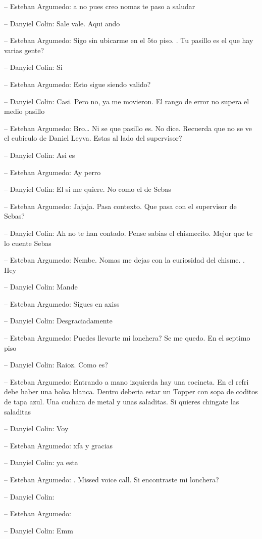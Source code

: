 -- Esteban Argumedo: a no pues creo nomas te paso a saludar

-- Danyiel Colin: Sale vale. Aqui ando

-- Esteban Argumedo: Sigo sin ubicarme en el 5to piso. . Tu pasillo es
el que hay varias gente?

-- Danyiel Colin: Si

-- Esteban Argumedo: Esto sigue siendo valido?

-- Danyiel Colin: Casi. Pero no, ya me movieron. El rango de error no
supera el medio pasillo

-- Esteban Argumedo: Bro\ldots{} Ni se que pasillo es. No dice. Recuerda
que no se ve el cubiculo de Daniel Leyva. Estas al lado del supervisor?

-- Danyiel Colin: Asi es

-- Esteban Argumedo: Ay perro

-- Danyiel Colin: El si me quiere. No como el de Sebas

-- Esteban Argumedo: Jajaja. Pasa contexto. Que pasa con el supervisor
de Sebas?

-- Danyiel Colin: Ah no te han contado. Pense sabias el chismecito.
Mejor que te lo cuente Sebas

-- Esteban Argumedo: Nembe. Nomas me dejas con la curiosidad del chisme.
. Hey

-- Danyiel Colin: Mande

-- Esteban Argumedo: Sigues en axiss

-- Danyiel Colin: Desgraciadamente

-- Esteban Argumedo: Puedes llevarte mi lonchera? Se me quedo. En el
septimo piso

-- Danyiel Colin: Raioz. Como es?

-- Esteban Argumedo: Entrando a mano izquierda hay una cocineta. En el
refri debe haber una bolsa blanca. Dentro deberia estar un Topper con
sopa de coditos de tapa azul. Una cuchara de metal y unas saladitas. Si
quieres chingate las saladitas

-- Danyiel Colin: Voy

-- Esteban Argumedo: xfa y gracias

-- Danyiel Colin: ya esta

-- Esteban Argumedo: . Missed voice call. Si encontraste mi lonchera?

-- Danyiel Colin:

-- Esteban Argumedo:

-- Danyiel Colin: Emm

